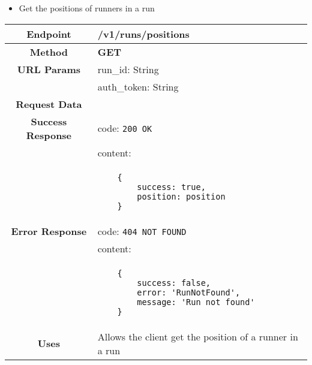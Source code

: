     
    \begin{itemize}
            \item Get the positions of runners in a run
        \end{itemize}
        \begin{adjustwidth}{1cm}{}
            \begin{longtable}{|c|l|}
                \hline
                \textbf{Endpoint} & /v1/runs/positions \\
                \hline
                \textbf{Method} & \textbf{GET} \\
                \hline
                \textbf{URL Params} &  run\_id: String \\
                &                      auth\_token: String \\
                \hline
                \textbf{Request Data} & \\
                \hline
                \textbf{Success Response} & code: \texttt{200 OK} \\
                &                           content: \\
                & \begin{minipage}[t]{0.5\textwidth}
                    \begin{adjustwidth}{1.5cm}{}
                    \begin{verbatim}
    {
        success: true, 
        position: position
    }
                    \end{verbatim}
                    \end{adjustwidth}
                  \end{minipage} \\
                  \hline
                \textbf{Error Response} & code: \texttt{404 NOT FOUND} \\
                &                         content: \\
                & \begin{minipage}[t]{0.7\textwidth}
                    \begin{adjustwidth}{1.5cm}{}
                    \begin{verbatim}
    {
        success: false, 
        error: 'RunNotFound',
        message: 'Run not found'
    }
                    \end{verbatim}
                    \end{adjustwidth}
                  \end{minipage} \\
                  \hline
                \textbf{Uses} & Allows the client get the position of a runner in a run \\
                \hline
                

\end{longtable}
\end{adjustwidth}

